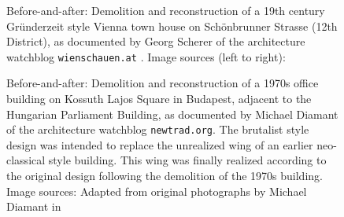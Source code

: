 \documentclass{article}
\begin{document}
\begin{figure}[ht!]
    \centering
    \caption{Before-and-after: Demolition and reconstruction of a 19th century Gründerzeit style Vienna town house on Schönbrunner Strasse (12th District), as documented by Georg Scherer of the architecture watchblog \texttt{wienschauen.at} \cite{scherer_zerstorung_nodate}. Image sources (left to right): \cite{scherer_schonbrunner_2018}\cite{wikimedia_commons_user_guentherz_wohnhaus_2014}}
    \label{fig:vienna}
\end{figure}
\vspace{-5mm}

\begin{figure}[ht!]
    \centering
    \caption{Before-and-after: Demolition and reconstruction of a 1970s office building on Kossuth Lajos Square in Budapest, adjacent to the Hungarian Parliament Building, as documented by Michael Diamant of the architecture watchblog \texttt{newtrad.org}. The brutalist style design was intended to replace the unrealized wing of an earlier neo-classical style building. This wing was finally realized according to the original design following the demolition of the 1970s building. Image sources: Adapted from original photographs by Michael Diamant in \cite{natalia_michael_2021} }
    \label{fig:budaptest}
\end{figure}
\end{document}

